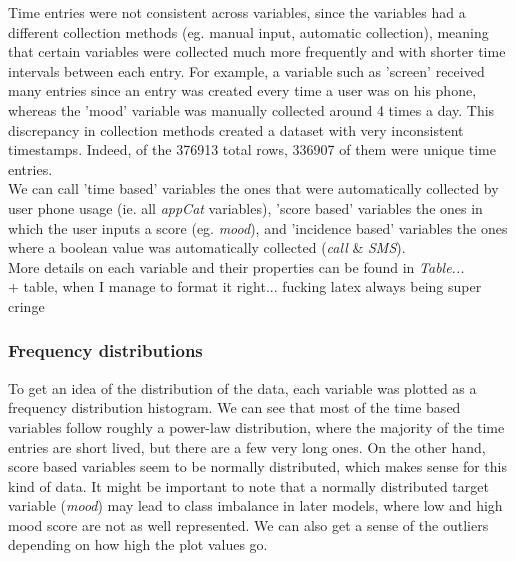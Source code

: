 \documentclass[runningheads]{llncs}
\begin{document}
Time entries were not consistent across variables, since the variables had a different collection methods (eg. manual input, automatic collection), meaning that certain variables were collected much more frequently and with shorter time intervals between each entry. For example, a variable such as 'screen' received many entries since an entry was created every time a user was on his phone, whereas the 'mood' variable was manually collected around 4 times a day. This discrepancy in collection methods created a dataset with very inconsistent timestamps. Indeed, of the 376913 total rows, 336907 of them were unique time entries. \\

We can call 'time based' variables the ones that were automatically collected by user phone usage (ie. all \textit{appCat} variables), 'score based' variables the ones in which the user inputs a score (eg. \textit{mood}), and 'incidence based' variables the ones where a boolean value was automatically collected (\textit{call} \& \textit{SMS}).  \\

More details on each variable and their properties can be found in \textit{Table...} \\


+ table, when I manage to format it right... fucking latex always being super cringe
% 

\subsubsection{Frequency distributions}
\phantom
\smallskip

To get an idea of the distribution of the data, each variable was plotted as a frequency distribution histogram. We can see that most of the time based variables follow roughly a power-law distribution, where the majority of the time entries are short lived, but there are a few very long ones. On the other hand, score based variables seem to be normally distributed, which makes sense for this kind of data.  It might be important to note that a normally distributed target variable (\textit{mood}) may lead to class imbalance in later models, where low and high mood score are not as well represented. We can also get a sense of the outliers depending on how high the plot values go. 

\end{document}
